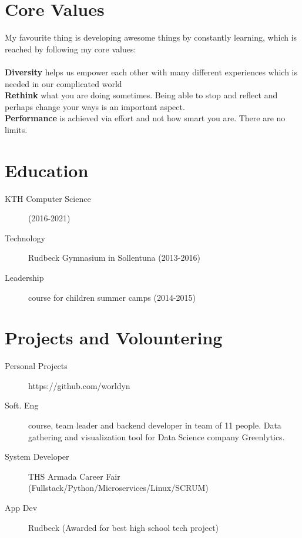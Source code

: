 \documentclass[margin,line,a4paper]{resume}
\begin{document}
\begin{resume}
\section{\mysidestyle Core Values}\vspace{1mm}
    My favourite thing is developing awesome things by constantly learning, which is reached by following my core values: 
    \\
    \\
    \textbf{Diversity} helps us empower each other with many different experiences which is needed in our complicated world
    \\
    \textbf{Rethink} what you are doing sometimes. Being able to stop and reflect and perhaps change your ways is an important aspect.
    \\
    \textbf{Performance} is achieved via effort and not how smart you are. There are no limits.

\section{\mysidestyle Education}\vspace{1mm}
    \begin{description}
        \item[KTH Computer Science] (2016-2021)
        \item[Technology] Rudbeck Gymnasium in Sollentuna (2013-2016)
        \item[Leadership] course for children summer camps (2014-2015)
    \end{description} 

\section{\mysidestyle Projects and Volountering}\vspace{1mm}
\begin{description}
    \item[Personal Projects] https://github.com/worldyn
    \item[Soft. Eng] course, team leader and backend developer in team of 11 people. Data gathering and visualization tool for Data Science company Greenlytics.
    \item[System Developer] THS Armada Career Fair (Fullstack/Python/Microservices/Linux/SCRUM)
    \item[App Dev] Rudbeck (Awarded for best high school tech project) 

\end{description}  
  

\end{resume}
\end{document}
